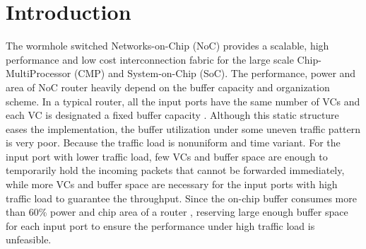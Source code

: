 \documentclass[10pt,conference]{IEEEtran}
\begin{document}
\section{Introduction}
The wormhole switched Networks-on-Chip (NoC) provides a scalable, high performance and low cost interconnection fabric for the large scale Chip-MultiProcessor (CMP) and System-on-Chip (SoC). The performance, power and area of NoC router heavily depend on the buffer capacity and organization scheme. In a typical router, all the input ports have the same number of VCs and each VC is designated a fixed buffer capacity \cite{DaTo01}. Although this static structure eases the implementation, the buffer utilization under some uneven traffic pattern is very poor. Because the traffic load is nonuniform and time variant. For the input port with lower traffic load, few VCs and buffer space are enough to temporarily hold the incoming packets that cannot be forwarded immediately, while more VCs and buffer space are necessary for the input ports with high traffic load to guarantee the throughput. Since the on-chip buffer consumes more than 60\% power and chip area of a router \cite{1650108}\cite{ChPe03}, reserving large enough buffer space for each input port to ensure the performance under high traffic load is unfeasible.

\end{document}
